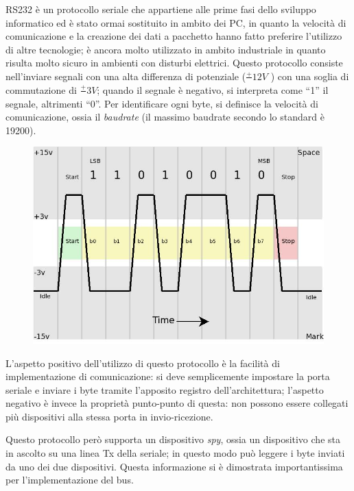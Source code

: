 \documentclass[a4paper,titlepage]{book}
\begin{document}
RS232 è un protocollo seriale che appartiene alle prime fasi dello sviluppo informatico ed è stato ormai sostituito in ambito dei PC, in quanto la velocità di comunicazione e la creazione dei dati a pacchetto hanno fatto preferire l'utilizzo di altre tecnologie; è ancora molto utilizzato in ambito industriale in quanto risulta molto sicuro in ambienti con disturbi elettrici. Questo protocollo consiste nell'inviare segnali con una alta differenza di potenziale ($ \frac{+}{}12V $ ) con una soglia di commutazione di $\frac{+}{} 3V $; quando il segnale è negativo, si interpreta come ``1'' il segnale, altrimenti ``0''. Per identificare ogni byte, si definisce la velocità di comunicazione, ossia il \textit{baudrate} (il massimo baudrate secondo lo standard è 19200).

\begin{figure}[!h]
\centering
\includegraphics[scale=0.35]{rs232.jpg}
\end{figure}

L'aspetto positivo dell'utilizzo di questo protocollo è la facilità di implementazione di comunicazione: si deve semplicemente impostare la porta seriale e inviare i byte tramite l'apposito registro dell'architettura; l'aspetto negativo è invece la proprietà punto-punto di questa: non possono essere collegati più dispositivi alla stessa porta in invio-ricezione.

Questo protocollo però supporta un dispositivo \textit{spy}, ossia un dispositivo che sta in ascolto su una linea Tx della seriale; in questo modo può leggere i byte inviati da uno dei due dispositivi. Questa informazione si è dimostrata importantissima per l'implementazione del bus.

~
\end{document}
